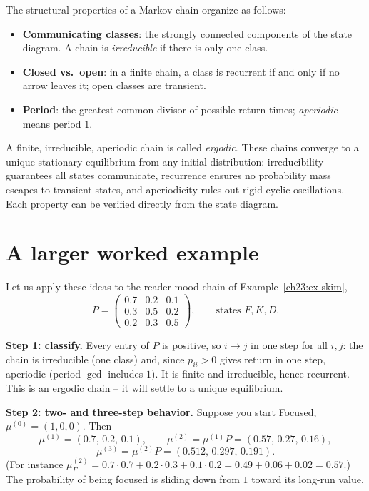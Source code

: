 \begin{aestheticbox}
The structural properties of a Markov chain organize as follows:
\begin{itemize}
  \item \textbf{Communicating classes}: the strongly connected components of the state diagram.
    A chain is \emph{irreducible} if there is only one class.
  \item \textbf{Closed vs.\ open}: in a finite chain, a class is recurrent if and only if no arrow
    leaves it; open classes are transient.
  \item \textbf{Period}: the greatest common divisor of possible return times; \emph{aperiodic}
    means period $1$.
\end{itemize}
A finite, irreducible, aperiodic chain is called \emph{ergodic}. These chains converge to a unique
stationary equilibrium from any initial distribution: irreducibility guarantees all states communicate,
recurrence ensures no probability mass escapes to transient states, and aperiodicity rules out
rigid cyclic oscillations. Each property can be verified directly from the state diagram.
\end{aestheticbox}

\section{A larger worked example}
\label{ch23:worked-example}

Let us apply these ideas to the reader-mood chain of Example~\ref{ch23:ex-skim},
\[
  P = \begin{pmatrix}
   0.7 & 0.2 & 0.1 \\
   0.3 & 0.5 & 0.2 \\
   0.2 & 0.3 & 0.5
  \end{pmatrix},
  \qquad \text{states } F, K, D.
\]

\textbf{Step 1: classify.} Every entry of $P$ is positive, so $i \to j$ in one step for all
$i,j$: the chain is irreducible (one class) and, since $p_{ii}>0$ gives return in one step,
aperiodic (period $\gcd$ includes $1$). It is finite and irreducible, hence recurrent. This is
an ergodic chain -- it will settle to a unique equilibrium.

\textbf{Step 2: two- and three-step behavior.} Suppose you start Focused, $\mu^{(0)} =
(1,0,0)$. Then
\[
  \mu^{(1)} = (0.7,\,0.2,\,0.1), \qquad
  \mu^{(2)} = \mu^{(1)}P = (0.57,\,0.27,\,0.16),
\]
\[
  \mu^{(3)} = \mu^{(2)}P = (0.512,\,0.297,\,0.191).
\]
(For instance $\mu^{(2)}_F = 0.7\cdot0.7 + 0.2\cdot0.3 + 0.1\cdot0.2 = 0.49+0.06+0.02 =
0.57$.) The probability of being focused is sliding down from $1$ toward its long-run value.

